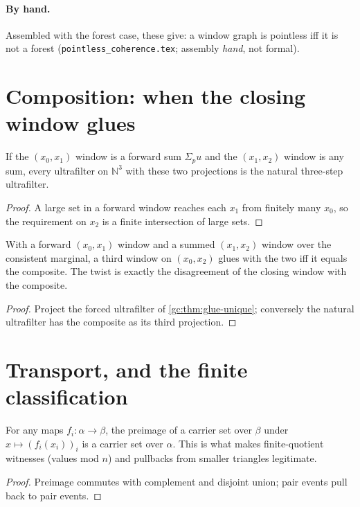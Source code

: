 \paragraph{By hand.} Assembled with the forest case, these give: a window graph
is pointless iff it is not a forest (\texttt{pointless\_coherence.tex};
assembly \emph{hand}, not formal).

\section{Composition: when the closing window glues}

\begin{theorem}[Forcing]
\label{gc:thm:glue-unique}
\leanok
If the $(x_0,x_1)$ window is a forward sum $\Sigma_p u$ and the $(x_1,x_2)$
window is any sum, every ultrafilter on $\mathbb N^3$ with these two projections
is the natural three-step ultrafilter.
\end{theorem}
\begin{proof}
\leanok
A large set in a forward window reaches each $x_1$ from finitely many $x_0$, so
the requirement on $x_2$ is a finite intersection of large sets.
\end{proof}

\begin{theorem}
\label{gc:thm:glues-iff}
\leanok
{}
With a forward $(x_0,x_1)$ window and a summed $(x_1,x_2)$ window over the
consistent marginal, a third window on $(x_0,x_2)$ glues with the two iff it
equals the composite. The twist is exactly the disagreement of the closing
window with the composite.
\end{theorem}
\begin{proof}
\leanok
Project the forced ultrafilter of \ref{gc:thm:glue-unique}; conversely the
natural ultrafilter has the composite as its third projection.
\end{proof}

\section{Transport, and the finite classification}

\begin{theorem}
\label{gc:thm:transport}
\leanok
{}
For any maps $f_i:\alpha\to\beta$, the preimage of a carrier set over $\beta$
under $x\mapsto(f_i(x_i))_i$ is a carrier set over $\alpha$. This is what makes
finite-quotient witnesses (values mod $n$) and pullbacks from smaller triangles
legitimate.
\end{theorem}
\begin{proof}
\leanok
Preimage commutes with complement and disjoint union; pair events pull back to
pair events.
\end{proof}

